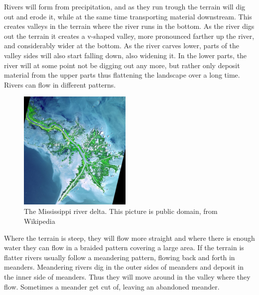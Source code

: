 \documentclass[a4paper,12pt]{report}
\begin{document}
Rivers will form from precipitation, and as they run trough the terrain will dig out and erode it, while at the same time transporting material downstream. This creates valleys in the terrain where the river runs in the bottom. As the river digs out the terrain it creates a v-shaped valley, more pronounced farther up the river, and considerably wider at the bottom. As the river carves lower, parts of the valley sides will also start falling down, also widening it. In the lower parts, the river will at some point not be digging out any more, but rather only deposit material from the upper parts thus flattening the landscape over a long time. Rivers can flow in different patterns.
\begin{figure}
  \begin{center}
   \vspace{-15pt}
    \includegraphics[width=0.48\textwidth]{thesis/geo/miss.jpg}
  \end{center}
   \vspace{-15pt}
  \caption{The Mississippi river delta. This picture is public domain, from Wikipedia}
   \vspace{10pt}
  \label{fig:miss}
\end{figure}
Where the terrain is steep, they will flow more straight and where there is enough water they can flow in a braided pattern covering a large area. If the terrain is flatter rivers usually follow a meandering pattern, flowing back and forth in meanders. Meandering rivers dig in the outer sides of meanders and deposit in the inner side of meanders. Thus they will move around in the valley where they flow. Sometimes a meander get cut of, leaving an abandoned meander. 
\end{document}
